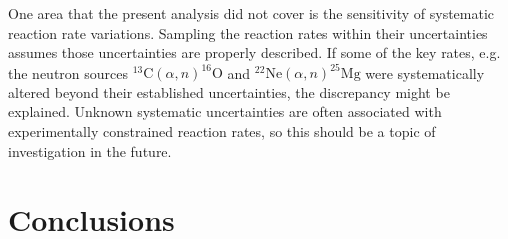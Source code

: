 One area that the present analysis did not cover is the sensitivity of systematic reaction rate variations. Sampling the reaction rates within their uncertainties assumes those uncertainties are properly described. If some of the key rates, e.g. the neutron sources $^{13}\mathrm{C}(\alpha,n)^{16}\mathrm{O}$ and $^{22}\mathrm{Ne}(\alpha,n)^{25}\mathrm{Mg}$ were systematically altered beyond their established uncertainties, the discrepancy might be explained. Unknown systematic uncertainties are often associated with experimentally constrained reaction rates, so this should be a topic of investigation in the future.






\section{Conclusions}


